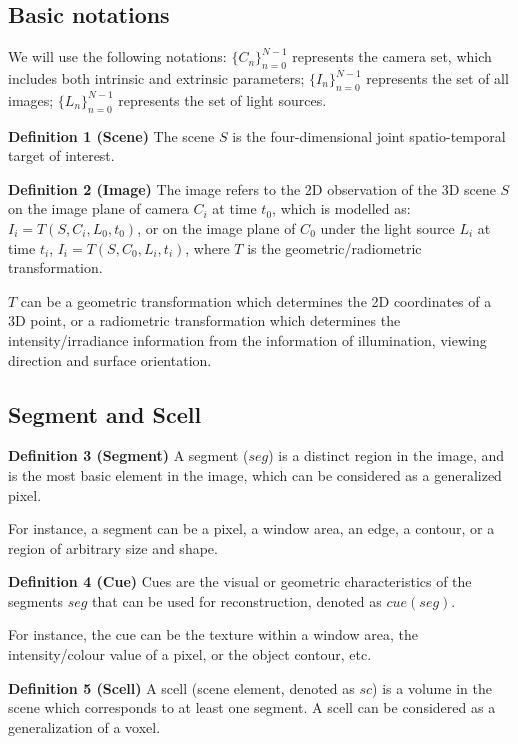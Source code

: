 \subsection{Basic notations}
We will use the following notations: $\{C_n\}_{n=0}^{N-1}$ represents the camera set, which includes both intrinsic and extrinsic parameters; $\{I_n\}_{n=0}^{N-1}$ represents the set of all images; $\{L_n\}_{n=0}^{N-1}$ represents the set of light sources.

\noindent\textbf{Definition 1 (Scene)} The scene $S$ is the four-dimensional joint spatio-temporal target of interest.

\noindent\textbf{Definition 2 (Image)} The image refers to the 2D observation of the 3D scene $S$ on the image plane of camera $C_i$ at time $t_0$, which is modelled as: $I_i = T(S, C_i, L_0, t_0)$, or on the image plane of $C_0$  under the light source $L_i$ at time $t_i$, $I_i= T(S, C_0, L_i, t_i)$, where $T$ is the geometric/radiometric transformation.

$T$ can be a geometric transformation which determines the 2D coordinates of a 3D point, or a radiometric transformation which determines the intensity/irradiance information from the information of illumination, viewing direction and surface orientation.

\subsection{Segment and Scell}
\noindent\textbf{Definition 3 (Segment)} A segment ($seg$) is a distinct region in the image, and is the most basic element in the image, which can be considered as a generalized pixel. 

For instance, a segment can be a pixel, a window area, an edge, a contour, or a region of arbitrary size and shape.

\noindent\textbf{Definition 4 (Cue)} Cues are the visual or geometric characteristics of the segments $seg$ that can be used for reconstruction, denoted as $cue(seg)$.

For instance, the cue can be the texture within a window area, the intensity/colour value of a pixel, or the object contour, etc.

\noindent\textbf{Definition 5 (Scell)} A scell (scene element, denoted as $sc$) is a volume in the scene which corresponds to at least one segment. A scell can be considered as a generalization of a voxel.

